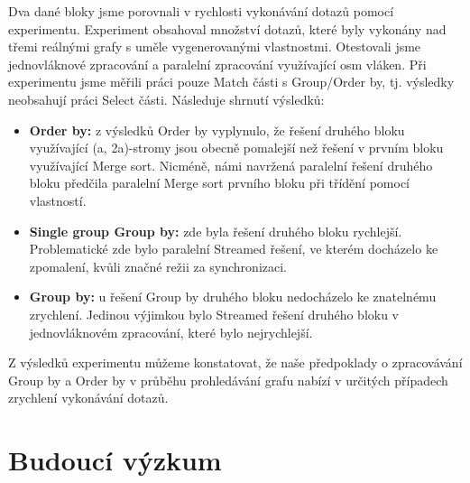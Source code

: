 Dva dané bloky jsme porovnali v rychlosti vykonávání dotazů pomocí experimentu.
Experiment obsahoval množství dotazů, které byly vykonány nad třemi reálnými grafy s uměle vygenerovanými vlastnostmi.
Otestovali jsme jednovláknové zpracování a paralelní zpracování využívající osm vláken.
Při experimentu jsme měřili práci pouze Match části s Group/Order by, tj. výsledky neobsahují práci Select části.
Následuje shrnutí výsledků:
\begin{itemize}

\item \textbf{Order by:} z výsledků Order by vyplynulo, že řešení druhého bloku využívající (a, 2a)-stromy jsou obecně pomalejší než řešení v prvním bloku využívající Merge sort.
Nicméně, námi navržená paralelní řešení druhého bloku předčila paralelní Merge sort prvního bloku při třídění pomocí vlastností.

\item \textbf{Single group Group by:} zde byla řešení druhého bloku rychlejší.
Problematické zde bylo paralelní Streamed řešení, ve kterém docházelo ke zpomalení, kvůli značné režii za synchronizaci.

\item \textbf{Group by:} u řešení Group by druhého bloku nedocházelo ke znatelnému zrychlení.
Jedinou výjimkou bylo Streamed řešení druhého bloku v jednovláknovém zpracování, které bylo nejrychlejší.

\end{itemize}

Z výsledků experimentu můžeme konstatovat, že naše předpoklady o zpracovávání Group by a Order by v průběhu prohledávání grafu nabízí v určitých případech zrychlení vykonávání dotazů.

\section{Budoucí výzkum}

